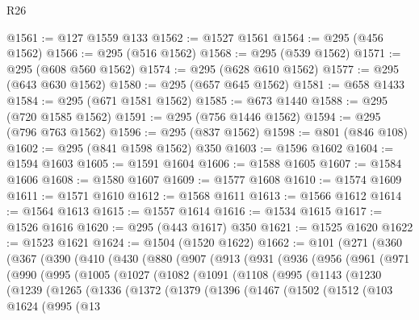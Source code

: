 \begin{lexlean}{R26}
\begin{coremodule}
@1561 := @127 @1559 @133
@1562 := @1527 @1561
@1564 := @295 (@456 @1562)
@1566 := @295 (@516 @1562)
@1568 := @295 (@539 @1562)
@1571 := @295 (@608 @560 @1562)
@1574 := @295 (@628 @610 @1562)
@1577 := @295 (@643 @630 @1562)
@1580 := @295 (@657 @645 @1562)
@1581 := @658 @1433
@1584 := @295 (@671 @1581 @1562)
@1585 := @673 @1440
@1588 := @295 (@720 @1585 @1562)
@1591 := @295 (@756 @1446 @1562)
@1594 := @295 (@796 @763 @1562)
@1596 := @295 (@837 @1562)
@1598 := @801 (@846 @108)
@1602 := @295 (@841 @1598 @1562) @350
@1603 := @1596 @1602
@1604 := @1594 @1603
@1605 := @1591 @1604
@1606 := @1588 @1605
@1607 := @1584 @1606
@1608 := @1580 @1607
@1609 := @1577 @1608
@1610 := @1574 @1609
@1611 := @1571 @1610
@1612 := @1568 @1611
@1613 := @1566 @1612
@1614 := @1564 @1613
@1615 := @1557 @1614
@1616 := @1534 @1615
@1617 := @1526 @1616
@1620 := @295 (@443 @1617) @350
@1621 := @1525 @1620
@1622 := @1523 @1621
@1624 := @1504 (@1520 @1622)
@1662 := @101
    (@271
      (@360
        (@367
          (@390
            (@410
              (@430
                (@880
                  (@907
                    (@913
                      (@931
                        (@936
                          (@956
                            (@961
                              (@971
                                (@990
                                  (@995
                                    (@1005
                                      (@1027
                                        (@1082
                                          (@1091
                                            (@1108
                                              (@995
                                                (@1143
                                                  (@1230
                                                    (@1239
                                                      (@1265
                                                        (@1336
                                                          (@1372
                                                            (@1379
                                                              (@1396
                                                                (@1467
                                                                  (@1502
                                                                    (@1512
                                                                      (@103
                                                                        @1624
                                                                        (@995
                                                                          (@13

\end{coremodule}
\end{lexlean}
